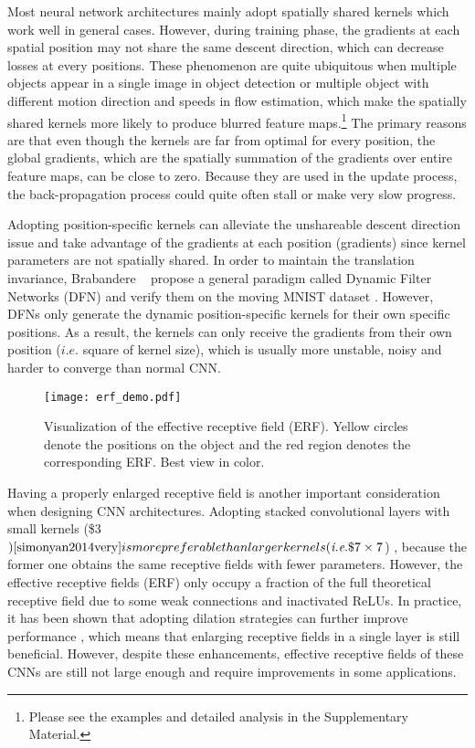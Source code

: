 \documentclass[runningheads]{llncs}
\begin{document}
Most neural network architectures mainly adopt spatially shared kernels which work well in general cases. However, during training phase, the gradients at each spatial position may not share the same descent direction, which can decrease losses at every positions. 
These phenomenon are quite ubiquitous when multiple objects appear in a single image in object detection or multiple object with different motion direction and speeds in flow estimation, which make the spatially shared kernels more likely to produce blurred feature maps.\footnote{Please see the examples and detailed analysis in the Supplementary Material.} The primary reasons are that even though the kernels are far from optimal for every position, the global gradients, which are the spatially summation of the gradients over entire feature maps, can be close to zero. 
Because they are used in the update process, the back-propagation process could quite often stall or make very slow progress.

Adopting position-specific kernels can alleviate the unshareable descent direction issue and take advantage of the gradients at each position (\ie\local gradients) since kernel parameters are not spatially shared. In order to maintain the translation invariance, Brabandere \etal\ \cite{de2016dynamic} propose a general paradigm called Dynamic Filter Networks (DFN) and verify them on the moving MNIST dataset \cite{srivastava2015unsupervised}. However, DFNs \cite{de2016dynamic} only generate the dynamic position-specific kernels for their own specific positions. As a result, the kernels can only receive the gradients from their own position ($i.e.$ square of kernel size), which is usually more unstable, noisy and harder to converge than normal CNN.

\begin{figure}[!t]
\centering
\texttt{[image: erf\_demo.pdf]}
\caption{Visualization of the effective receptive field (ERF). Yellow circles denote the positions on the object and the red region denotes the corresponding ERF. Best view in color.}
\label{fig:erf_demo}
\end{figure}

Having a properly enlarged receptive field is another important consideration when designing CNN architectures. Adopting stacked convolutional layers with small kernels (\ie\$3$) \cite{simonyan2014very} is more preferable than larger kernels (\ie\$7\times 7$) \cite{NIPS2012_4824}, because the former one obtains the same receptive fields with fewer parameters. 
However, the effective receptive fields (ERF) \cite{Luo2016UnderstandingTE} only occupy a fraction of the full theoretical receptive field due to some weak connections and inactivated ReLUs. In practice, it has been shown that adopting dilation strategies \cite{chen2016deeplab} can further improve performance \cite{dai2016r,li2016fully}, which means that enlarging receptive fields in a single layer is still beneficial.  However, despite these enhancements, effective receptive fields of these CNNs are still not large enough and require improvements in some applications.
\end{document}
